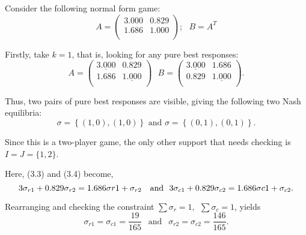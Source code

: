 Consider the following normal form game:
\begin{equation}
    A = \begin{pmatrix}
        3.000 & 0.829 \\
        1.686 & 1.000 \\
    \end{pmatrix}; ~~~
    B = A^{T}
\end{equation}\label{eqn:supp_en_ex}

Firstly, take \(k = 1\), that is, looking for any pure best responses:
\begin{displaymath}
    A = \begin{pmatrix}
        \underline{3.000} & 0.829 \\
        1.686 & \underline{1.000} \\
    \end{pmatrix} ~~~ B = \begin{pmatrix}
        \underline{3.000} & 1.686 \\
        0.829 & \underline{1.000} \\
    \end{pmatrix}.
\end{displaymath}

Thus, two pairs of pure best responses are visible, giving the following two
Nash equilibria:
\begin{displaymath}
    \sigma = \left \{(1, 0), (1, 0)\right \} \text{   and   } \sigma = \left \{(0, 1), (0, 1)\right \}.
\end{displaymath}

Since this is a two-player game, the only other support that needs checking is
\(I = J = \{1, 2\} \). 

Here, (3.3) and (3.4) become,
\begin{displaymath}
    3\sigma_{r1} + 0.829\sigma_{r2} = 1.686\sigma{r1} + \sigma_{r2} ~~ \text{   and   } ~~ \\
    3\sigma_{c1} + 0.829\sigma_{c2} = 1.686\sigma{c1} + \sigma_{c2}.
\end{displaymath}

Rearranging and checking the constraint \(\sum{\sigma_{r} = 1}, ~~
\sum{\sigma_{c} = 1}\), yields 
\begin{displaymath}
    \sigma_{r1} = \sigma_{c1} = \frac{19}{165} ~~ \text{ and } ~~ \sigma_{r2} = \sigma_{c2} = \frac{146}{165}.
\end{displaymath}

